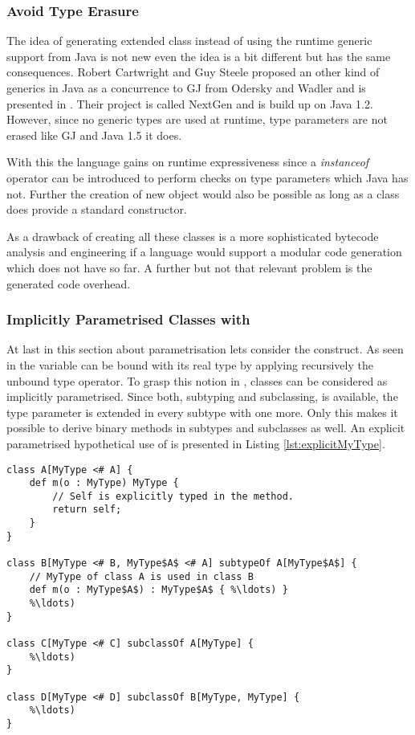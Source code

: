 \subsubsection{Avoid Type Erasure}
The idea of generating extended class instead of using the runtime
generic support from Java is not new even the idea is a bit different
but has the same consequences. Robert Cartwright and Guy Steele proposed
an other kind of generics in Java as a concurrence to GJ from Odersky
and Wadler and is presented in \cite{cartwright_compatible_1998}. Their
project is called NextGen and is build up on Java 1.2. However, since
no generic types are used at runtime, type parameters are not erased
like GJ and Java 1.5 it does.

With this the language gains on runtime expressiveness since a
\emph{instanceof} operator can be introduced to perform checks on type
parameters which Java has not. Further the creation of new object would
also be possible as long as a class does provide a standard constructor.

As a drawback of creating all these classes is a more sophisticated 
bytecode analysis and engineering if a language would support a modular
code generation which \ooplss does not have so far. A further but not 
that relevant problem is the generated code overhead.

\subsubsection{Implicitly Parametrised Classes with \mytype}
At last in this section about parametrisation lets consider the \mytype
construct. As seen in  the \self variable
can be bound with its real type by applying recursively the unbound type
operator. To grasp this notion in \ooplss, classes can be considered
as implicitly parametrised. Since both, subtyping and subclassing, is
available, the type parameter is extended in every subtype with one more.
Only this makes it possible to derive binary methods in subtypes
and subclasses as well. An explicit parametrised hypothetical use of
\mytype is presented in Listing \ref{lst:explicitMyType}.

\begin{lstlisting}[float,language=ooplss,caption=Explicit \mytype,label=lst:explicitMyType]
class A[MyType <# A] {
	def m(o : MyType) MyType {
		// Self is explicitly typed in the method.
		return self;
	}
}

class B[MyType <# B, MyType$A$ <# A] subtypeOf A[MyType$A$] {
	// MyType of class A is used in class B
	def m(o : MyType$A$) : MyType$A$ { %\ldots) }
	%\ldots)
}

class C[MyType <# C] subclassOf A[MyType] {
	%\ldots)
}

class D[MyType <# D] subclassOf B[MyType, MyType] {
	%\ldots)
}
\end{lstlisting}


